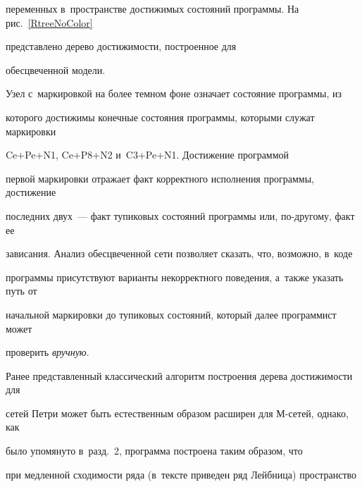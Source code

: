 переменных в~про\-стран\-ст\-ве до\-сти\-жи\-мых со\-сто\-яний программы. На рис.~\ref{RtreeNoColor} 


пред\-став\-ле\-но дерево до\-сти\-жи\-мости, по\-стро\-ен\-ное для 


обес\-цве\-чен\-ной модели.












Узел с~маркировкой на более темном фоне означает со\-сто\-яние программы, из 


которого до\-сти\-жи\-мы конечные со\-сто\-яния программы, которыми служат маркировки 


Ce\;+\;Pe\;+\;N1,  Ce\;+\;P8\;+\;N2 и~C3\;+\;Pe\;+\;N1. До\-сти\-же\-ние программой 


первой маркировки отражает факт корректного исполнения программы, до\-сти\-же\-ние 


по\-след\-них двух~--- факт тупиковых со\-сто\-яний программы или, по-дру\-го\-му, факт ее 


зависания. Анализ обес\-цве\-чен\-ной сети поз\-во\-ляет сказать, что, возможно, в~коде 


программы присутствуют варианты некорректного поведения, а~так\-же указать путь от 


начальной маркировки до тупиковых со\-сто\-яний, который далее программист может 


проверить \textit{вручную}.














Ранее представленный классический алгоритм по\-стро\-ения дерева до\-сти\-жи\-мости для 


сетей Петри может быть естественным образом расширен для М-се\-тей, однако, как 


было упомянуто в~разд.~2, программа по\-стро\-ена таким образом, что 


при медленной схо\-ди\-мости ряда (в~текс\-те приведен ряд Лейбница) пространство 


